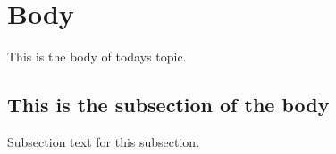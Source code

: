 \section{Body}
  This is the body of todays topic.

  \subsection{This is the subsection of the body}
    Subsection text for this subsection.
  
